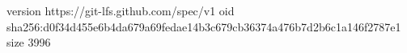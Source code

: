 version https://git-lfs.github.com/spec/v1
oid sha256:d0f34d455e6b4da679a69fedae14b3c679cb36374a476b7d2b6c1a146f2787e1
size 3996
